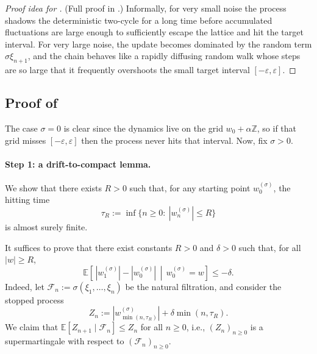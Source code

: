 \documentclass{article}
\theoremstyle{plain}
\theoremstyle{definition}
\theoremstyle{remark}
\newcommand{\E}{\mathbb{E}}
\newcommand{\Z}{\mathbb{Z}}
\newcommand{\cF}{\mathcal{F}}
\newcommand{\stepsize}{\alpha}
\newcommand{\eps}{\varepsilon}
\begin{document}
\begin{proof}[Proof idea for ]
  (Full proof in .)
Informally, for very small noise the process shadows 
the deterministic two-cycle for a long time before 
accumulated fluctuations are large enough 
to sufficiently escape the lattice and hit the target interval. 
For very large noise, 
the update becomes dominated by the random term $\sigma\xi_{n+1}$, and the chain behaves like a 
rapidly diffusing random walk whose steps are so large that it frequently overshoots the small target interval $[-\eps,\eps]$.  
\end{proof}

\subsection{Proof of } \label{sec:noise-breaks-grid}

The case $\sigma=0$ is clear since the dynamics live on the grid
$w_0 + \stepsize\Z$, so if that grid misses $[-\eps,\eps]$ then the process never hits that interval. 
Now, fix $\sigma>0$.

\paragraph{Step 1: a drift-to-compact lemma.}
We show that there exists $R>0$ such that, for any starting point $w_0^{(\sigma)}$,
the hitting time
\[
\tau_R:=\inf\{n\ge0:\ |w_n^{(\sigma)}|\le R\}
\]
is almost surely finite.

It suffices to prove that there exist constants $R>0$ and $\delta>0$ such that, for all $|w|\ge R$,
\begin{equation}
\label{eq:drift-compact}
\E\!\left[\,|w_1^{(\sigma)}|-|w_0^{(\sigma)}| \,\middle|\, w_0^{(\sigma)}=w\right]\le -\delta.
\end{equation}
Indeed, let $\cF_n:=\sigma(\xi_1,\dots,\xi_n)$ be the natural filtration, 
and consider the stopped process
\[
Z_n := |w_{\min(n, \tau_R)}^{(\sigma)}|+\delta \min(n,\tau_R).
\]
We claim that  $\E\!\left[ Z_{n+1}\mid \cF_n\right]\le Z_n$ for all $n\ge0$, 
i.e., $(Z_n)_{n\ge0}$ is a supermartingale with respect to $(\cF_n)_{n\ge0}$. 
\end{document}
